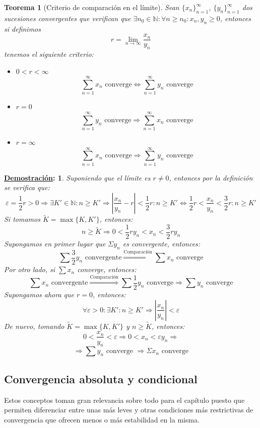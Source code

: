 \documentclass[10pt,a4paper,openright]{book}
\theoremstyle{break}
\newtheorem*{theo}{Teorema}
\newtheorem*{demo}{\underline{Demostración}:}
\begin{document}
\begin{theo}[Criterio de comparación en el límite]
Sean $\{x_n\}_{n=1}^\infty$, $\{y_n\}_{n=1}^\infty$ dos sucesiones convergentes que verifican que $\exists n_0 \in \mathbb{N}: \forall n \geq n_0 : x_n , y_n \geq 0$, entonces si definimos
$$r = \lim_{n \rightarrow \infty} \frac{x_n}{y_n}$$
tenemos el siguiente criterio:
\begin{itemize}
\item $0< r <\infty$
$$\sum_{n=1}^{\infty} x_n \mbox{ converge} \Leftrightarrow \sum_{n=1}^{\infty} y_n \mbox{ converge}$$
\item $r = 0$
$$\sum_{n=1}^{\infty} y_n \mbox{ converge} \Rightarrow \sum_{n=1} ^{\infty} x_n \mbox{ converge}$$
\item $r= \infty$
$$\sum_{n=1}^{\infty} x_n \mbox{ converge} \Rightarrow \sum_{n=1} ^{\infty} y_n \mbox{ converge}$$
\end{itemize}
\end{theo}
\begin{demo}
Suponiendo que el límite es $r \neq 0$, entonces por la definición se verifica que:
$$\varepsilon = \frac{1}{2} r>0 \Rightarrow \exists K' \in \mathbb{N} : n \geq K' \Rightarrow | \frac{x_n}{y_n} - r|< \frac{1}{2} r : n \geq K' \Leftrightarrow \frac{1}{2} r <\frac{x_n}{y_n} < \frac{3}{2} r : n \geq K'$$
Si tomamos $\tilde{K} = \max \{K, K'\}$, entonces:
$$n \geq \tilde{K} \Rightarrow 0 <\frac{1}{2} r y_n < x_n < \frac{3}{2} r y_n $$
Supongamos en primer lugar que $\Sigma y_n$ es convergente, entonces:
$$\sum \frac{3}{2} y_n\mbox{ convergente} \overset{\mbox{Comparación}}{\Rightarrow} \sum x_n \mbox{ converge}$$
Por otro lado, si $\sum x_n$ converge, entonces:
$$\sum x_n\mbox{ convergente} \overset{\mbox{Comparación}}{\Rightarrow} \sum \frac{1}{2} y_n \mbox{ converge}\Rightarrow \sum y_n\mbox{ converge}$$
Supongamos ahora que $r=0$, entonces:
$$\forall \varepsilon >0: \exists K': n \geq K' \Rightarrow |\frac{x_n}{y_n}| < \varepsilon$$
De nuevo, tomando $\tilde{K} = \max \{K, K'\}$ y $n \geq \tilde{K}$, entonces:
$$0 < \frac{x_n}{y_n} < \varepsilon \Rightarrow 0 < x_n < \varepsilon y_n \Rightarrow$$
$$\Rightarrow \sum y_n \mbox{ converge }\Rightarrow \Sigma x_n \mbox{ converge}$$
\end{demo}

\subsection{Convergencia absoluta y condicional}
Estos conceptos toman gran relevancia sobre todo para el capítulo  puesto que permiten diferenciar entre unas más leves y otras condiciones más restrictivas de convergencia que ofrecen menos o más estabilidad en la misma.
\end{document}
